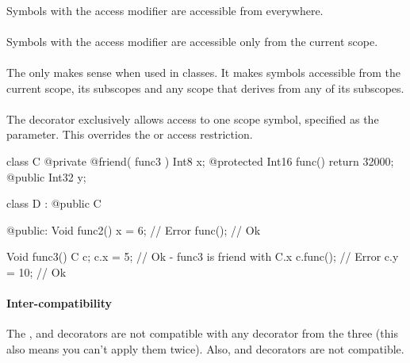 \paragraph{} \label{decorator:public} Symbols with the  access modifier are accessible from everywhere.

\paragraph{} \label{decorator:private} Symbols with the  access modifier are accessible only from the current scope.

\paragraph{} \label{decorator:protected} The  only makes sense when used in classes. It makes symbols accessible from the current scope, its subscopes and any scope that derives from any of its subscopes.

\paragraph{} \label{decorator:friend} The  decorator exclusively allows access to one scope symbol, specified as the parameter. This overrides the  or  access restriction.

\begin{code}
class C {
	@private @friend( func3 ) Int8 x;
	@protected Int16 func() {
		return 32000;
	}	
	@public Int32 y;
}

class D : @public C {
	
@public:
	Void func2() {
		x = 6; // Error
		func(); // Ok
	}
	
}

Void func3() {
	C c;
	c.x = 5; // Ok - func3 is friend with C.x
	c.func(); // Error
	c.y = 10; // Ok
}
\end{code}

\paragraph{Inter-compatibility}
The ,  and  decorators are not compatible with any decorator from the three (this also means you can't apply them twice). Also,  and  decorators are not compatible.

